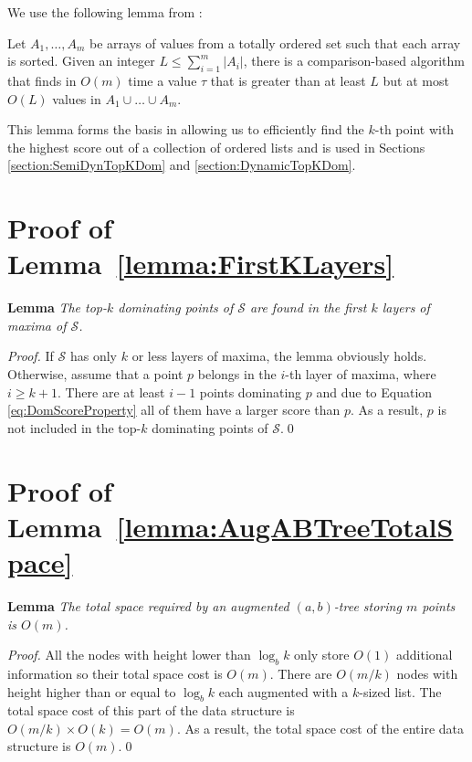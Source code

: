 \documentclass{llncs}
\begin{document}
We use the following lemma from \cite{Frederickson82}:
\begin{lemma}\label{lemma:TopKDomLemma}
    Let $A_1,\ldots,A_m$ be arrays of values from a totally ordered set such that each array is sorted.
    Given an integer $L \leq \sum_{i = 1}^m {\left| {{A_i}} \right|} $, there is a comparison-based algorithm that finds in $O(m)$ time a value $\tau$ that is greater than at least $L$ but at most $O(L)$ values in $A_1\cup\ldots\cup A_m$.
\end{lemma}

This lemma forms the basis in allowing us to efficiently find the $k$-th point with the highest score out of a collection of ordered lists and is used in Sections \ref{section:SemiDynTopKDom} and \ref{section:DynamicTopKDom}.


\section{Proof of Lemma~\ref{lemma:FirstKLayers}} \label{app:lemma1}

\textbf{Lemma} \textit{The top-$k$ dominating points of $\mathcal{S}$ are found in the first $k$ layers of maxima of $\mathcal{S}$.}

\begin{proof}
If $\mathcal{S}$ has only $k$ or less layers of maxima, the lemma obviously holds. Otherwise, assume that a point $p$ belongs in the $i$-th layer of maxima, where $i\geq k+1$. There are at least $i-1$ points dominating $p$ and due to Equation \ref{eq:DomScoreProperty} all of them have a larger score than $p$. As a result, $p$ is not included in the top-$k$ dominating points of $\mathcal{S}$.\qed
\end{proof}



\section{Proof of Lemma~\ref{lemma:AugABTreeTotalSpace}} \label{app:lemma2}

\textbf{Lemma} \textit{The total space required by an augmented $(a,b)$-tree storing $m$ points is $O(m)$.}

\begin{proof}
All the nodes with height lower than $\log_{b}k$ only store $O(1)$ additional information so their total space cost is $O(m)$. There are $O(m/k)$ nodes with height higher than or equal to $\log_{b}k$ each augmented with a $k$-sized list. The total space cost of this part of the data structure is $O(m/k)\times O(k)=O(m)$. As a result, the total space cost of the entire data structure is $O(m)$.\qed
\end{proof}
\end{document}
